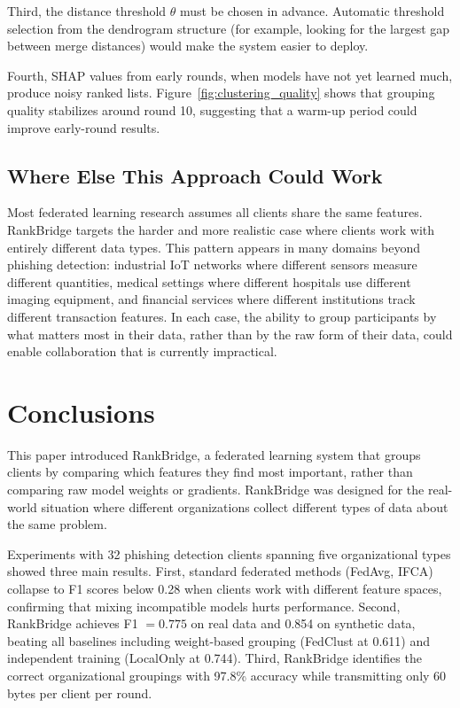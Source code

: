 \documentclass[information,article,submit,pdftex]{mdpi}
\begin{document}
Third, the distance threshold $\theta$ must be chosen in advance. Automatic
threshold selection from the dendrogram structure (for example, looking for the
largest gap between merge distances) would make the system easier to deploy.

Fourth, SHAP values from early rounds, when models have not yet learned much,
produce noisy ranked lists. Figure~\ref{fig:clustering_quality} shows that
grouping quality stabilizes around round 10, suggesting that a warm-up period
could improve early-round results.

\subsection{Where Else This Approach Could Work}

Most federated learning research assumes all clients share the same features.
RankBridge targets the harder and more realistic case where clients work with
entirely different data types. This pattern appears in many domains beyond
phishing detection: industrial IoT networks where different sensors measure
different quantities, medical settings where different hospitals use different
imaging equipment, and financial services where different institutions track
different transaction features. In each case, the ability to group participants
by what matters most in their data, rather than by the raw form of their data,
could enable collaboration that is currently impractical.

\section{Conclusions}\label{sec:conclusions}

This paper introduced RankBridge, a federated learning system that groups clients
by comparing which features they find most important, rather than comparing raw
model weights or gradients. RankBridge was designed for the real-world situation
where different organizations collect different types of data about the same
problem.

Experiments with 32 phishing detection clients spanning five organizational types
showed three main results. First, standard federated methods (FedAvg, IFCA)
collapse to F1 scores below 0.28 when clients work with different feature spaces,
confirming that mixing incompatible models hurts performance. Second, RankBridge
achieves F1 $= 0.775$ on real data and 0.854 on synthetic data, beating all
baselines including weight-based grouping (FedClust at 0.611) and independent
training (LocalOnly at 0.744). Third, RankBridge identifies the correct
organizational groupings with 97.8\% accuracy while transmitting only 60 bytes
per client per round.
\end{document}
